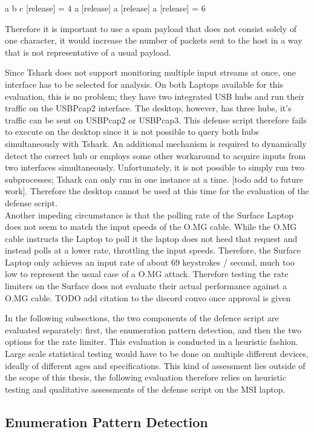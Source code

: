 a b c [release] = 4
a [release] a [release] a [release] = 6

Therefore it is important to use a spam payload that does not consist solely of one character, it would increase the number of packets sent to the host in a way that is not representative of a usual payload.


Since Tshark does not support monitoring multiple input streams at once, one interface has to be selected for analysis. On both Laptops available for this evaluation, this is no problem; they have two integrated USB hubs and run their traffic on the USBPcap2 interface. The desktop, however, has three hubs, it's traffic can be sent on USBPcap2 or USBPcap3. This defense script therefore fails to execute on the desktop since it is not possible to query both hubs simultaneously with Tshark. An additional mechanism is required to dynamically detect the correct hub or employs some other workaround to acquire inputs from two interfaces simultaneously. Unfortunately, it is not possible to simply run two subprocesses; Tshark can only run in one instance at a time. [todo add to future work]. Therefore the desktop cannot be used at this time for the evaluation of the defense script.  \\

Another impeding circumstance is that the polling rate of the Surface Laptop does not seem to match the input speeds of the O.MG cable. While the O.MG cable instructs the Laptop to poll it the laptop does not heed that request and instead polls at a lower rate, throttling the input speeds. Therefore, the Surface Laptop only achieves an input rate of about 69 keystrokes / second, much too low to represent the usual case of a O.MG attack. Therefore testing the rate limiters on the Surface does not evaluate their actual performance against a O.MG cable. 
TODO add citation to the discord convo once approval is given


In the following subsections, the two components of the defence script are evaluated separately: first, the enumeration pattern detection, and then the two options for the rate limiter. This evaluation is conducted in a heuristic fashion. Large scale statistical testing would have to be done on multiple different devices, ideally of different ages and specifications. This kind of assessment lies outside of the scope of this thesis, the following evaluation therefore relies on heuristic testing and qualitative assessments of the defense script on the MSI laptop.


\subsection{Enumeration Pattern Detection}

